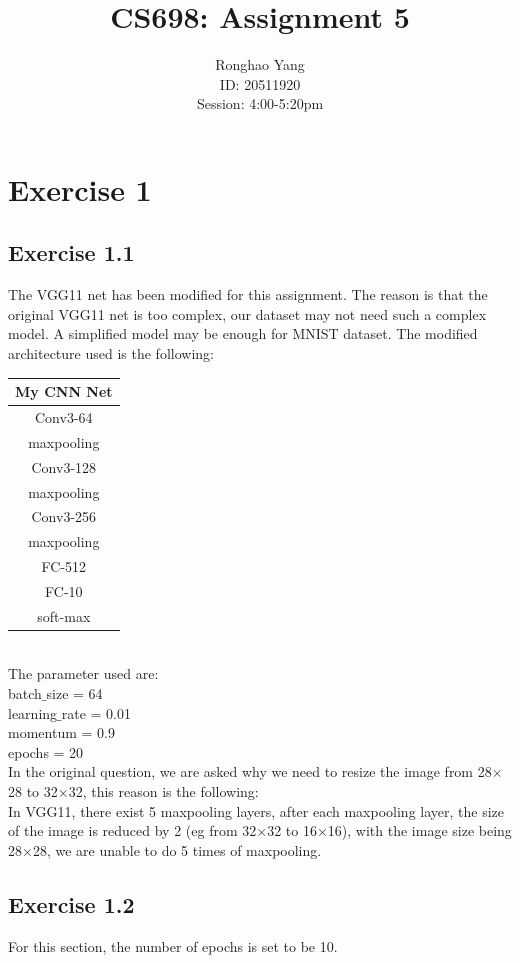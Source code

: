 \documentclass[11pt]{article} %
\title{CS698: Assignment 5}
\author{Ronghao Yang\\ID: 20511920\\Session: 4:00-5:20pm}
\begin{document}
\maketitle

\section{Exercise 1}
\subsection{Exercise 1.1}
The VGG11 net has been modified for this assignment. The reason is that the original VGG11 net is too complex, our dataset may not need such a complex model. A simplified model may be enough for MNIST dataset. The modified architecture used is the following:\\
\begin{center}
 \begin{tabular}{||c||} 
 \hline
My CNN Net \\ [0.5ex] 
 \hline\hline
 Conv3-64 \\ 
 \hline
  maxpooling \\
 \hline
  Conv3-128 \\
 \hline
maxpooling\\
 \hline
 Conv3-256 \\ 
 \hline
 maxpooling\\
  \hline
  FC-512\\
  \hline
  FC-10\\
  \hline
  soft-max\\
  \hline
\end{tabular}
\end{center}\mbox{}\\
The parameter used are:\\
batch$\_$size = 64\\
learning$\_$rate = 0.01\\
momentum = 0.9\\
epochs = 20\\
In the original question, we are asked why we need to resize the image from 28$\times$28 to 32$\times$32, this reason is the following:\\
In VGG11, there exist 5 maxpooling layers, after each maxpooling layer, the size of the image is reduced by 2 (eg from 32$\times$32 to 16$\times$16), with the image size being 28$\times$28, we are unable to do 5 times of maxpooling.
\subsection{Exercise 1.2}
For this section, the number of epochs is set to be 10.
\end{document}
